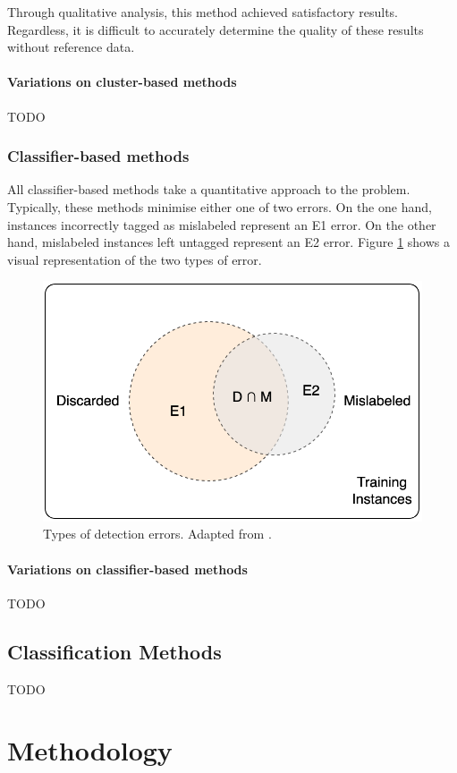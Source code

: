 \documentclass[12pt, english, openany]{book}
\begin{document}
Through qualitative analysis, this method achieved satisfactory results.
Regardless, it is difficult to accurately determine the quality of these
results without reference data.

\subsubsection*{Variations on cluster-based methods}
TODO

\subsection*{Classifier-based methods}

All classifier-based methods take a quantitative approach to the problem.
Typically, these methods minimise either one of two errors. On the one hand,
instances incorrectly tagged as mislabeled represent an E1 error. On the other
hand, mislabeled instances left untagged represent an E2 error. Figure
\ref{fig:types-detection-errors} shows a visual representation of the two types
of error.

\begin{figure}[H]
	\centering
	\includegraphics[width=.6\linewidth]{detection_errors_types.png}
  \caption{Types of detection errors. Adapted from \cite{Brodley1999}.}
  \label{fig:types-detection-errors}
\end{figure}


\subsubsection*{Variations on classifier-based methods}
TODO

\section{Classification Methods}
TODO

\chapter{Methodology}
\end{document}
